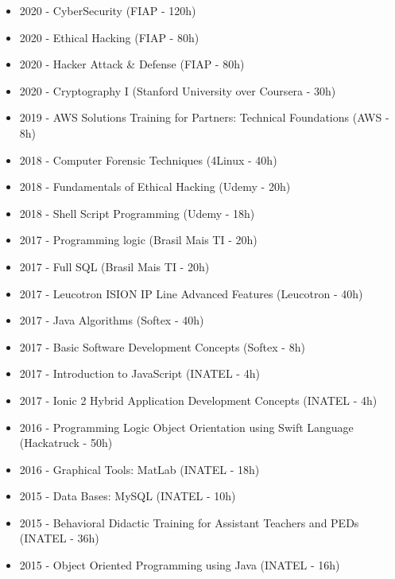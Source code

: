 \documentclass[10pt,a4paper,ragged2e, normalphoto]{altacv}
\begin{document}
\begin{fullwidth}

\begin{itemize}
    \item 2020 - CyberSecurity (FIAP - 120h)
    \item 2020 - Ethical Hacking (FIAP - 80h)
    \item 2020 - Hacker Attack \& Defense (FIAP - 80h)
    \item 2020 - Cryptography I (Stanford University over Coursera - 30h)
    \item 2019 - AWS Solutions Training for Partners: Technical Foundations (AWS - 8h)
    \item 2018 - Computer Forensic Techniques (4Linux - 40h)
    \item 2018 - Fundamentals of Ethical Hacking (Udemy - 20h)
    \item 2018 - Shell Script Programming (Udemy - 18h)
    \item 2017 - Programming logic (Brasil Mais TI - 20h)
    \item 2017 - Full SQL (Brasil Mais TI - 20h)
    \item 2017 - Leucotron ISION IP Line Advanced Features (Leucotron - 40h)
    \item 2017 - Java Algorithms (Softex - 40h)
    \item 2017 - Basic Software Development Concepts (Softex - 8h)
    \item 2017 - Introduction to JavaScript (INATEL - 4h)
    \item 2017 - Ionic 2 Hybrid Application Development Concepts (INATEL - 4h)
    \item 2016 - Programming Logic Object Orientation using Swift Language (Hackatruck - 50h)
    \item 2016 - Graphical Tools: MatLab (INATEL - 18h)
    \item 2015 - Data Bases: MySQL (INATEL - 10h)
    \item 2015 - Behavioral Didactic Training for Assistant Teachers and PEDs (INATEL - 36h)
    \item 2015 - Object Oriented Programming using Java (INATEL - 16h)
\end{itemize}

\end{fullwidth}
\end{document}

